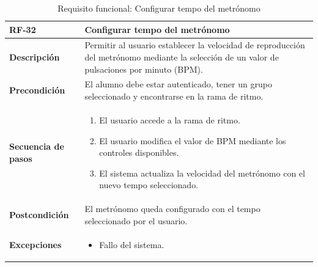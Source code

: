 \begin{table}[H]
\centering
\begin{tabularx}{\textwidth}{
  |>{\centering\arraybackslash}l
  |>{\centering\arraybackslash}X|}
\hline

\textbf{RF-32} & \textbf{Configurar tempo del metrónomo} \\ \hline

\textbf{Descripción} & Permitir al usuario establecer la velocidad de reproducción del metrónomo mediante la selección de un valor de pulsaciones por minuto (BPM). \\ \hline

\textbf{Precondición} & El alumno debe estar autenticado, tener un grupo seleccionado y encontrarse en la rama de ritmo. \\ \hline

\textbf{Secuencia de pasos} &
\begin{enumerate}
\item El usuario accede a la rama de ritmo.
\item El usuario modifica el valor de BPM mediante los controles disponibles.
\item El sistema actualiza la velocidad del metrónomo con el nuevo tempo seleccionado.
\end{enumerate} \\ \hline

\textbf{Postcondición} & El metrónomo queda configurado con el tempo seleccionado por el usuario. \\ \hline

\textbf{Excepciones} &
\begin{itemize}
\item Fallo del sistema.
\end{itemize} \\ \hline

\end{tabularx}
\caption{Requisito funcional: Configurar tempo del metrónomo}
\end{table}

